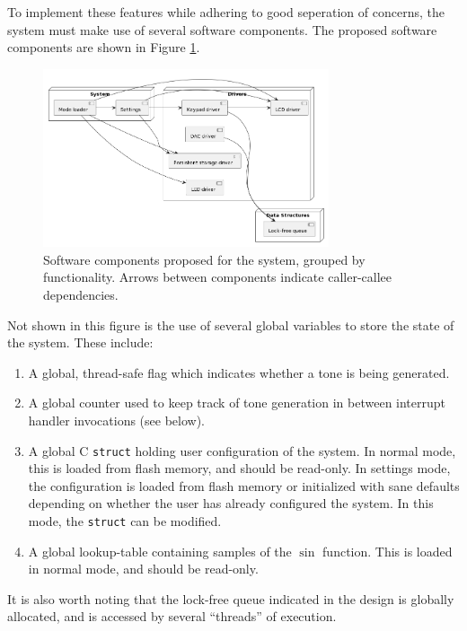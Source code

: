 \documentclass[11pt,a4paper
]{scrartcl}
\begin{document}
To implement these features while adhering to good seperation of concerns, the system must make use of several software components.
The proposed software components are shown in Figure \ref{fig:software_components}.

\begin{figure}
   \centering
   \includegraphics[width=0.75\textwidth]{software_components}
   \caption{Software components proposed for the system, grouped by functionality. Arrows between components indicate caller-callee dependencies.}
   \label{fig:software_components}
\end{figure}

Not shown in this figure is the use of several global variables to store the state of the system. These include:

\begin{enumerate}
   \item A global, thread-safe flag which indicates whether a tone is being generated.
   \item A global counter used to keep track of tone generation in between interrupt handler invocations (see below).
   \item A global C \verb!struct! holding user configuration of the system. 
      In normal mode, this is loaded from flash memory, and should be read-only.
      In settings mode, the configuration is loaded from flash memory or initialized with sane defaults depending on whether the user has already 
      configured the system. In this mode, the \verb!struct! can be modified.
   \item A global lookup-table containing samples of the $\sin$ function. This is loaded in normal mode, and should be read-only.
\end{enumerate}

It is also worth noting that the lock-free queue indicated in the design is globally allocated, and is accessed by several ``threads'' of execution.
\end{document}
